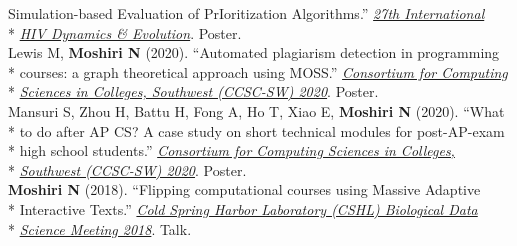 \documentclass[margin,line]{res}
\begin{document}
\begin{resume}
\hspace*{9mm} Simulation-based Evaluation of PrIoritization Algorithms.'' \href{https://cme.ucsd.edu/hivdynamics/}{\textit{27th International}}\\*\vspace{2mm}
\hspace*{8mm} \href{https://cme.ucsd.edu/hivdynamics/}{\textit{HIV Dynamics \& Evolution}}. Poster.\\
\hspace*{4mm} Lewis M, \textbf{Moshiri N} (2020). ``Automated plagiarism detection in programming\\*
\hspace*{9mm} courses: a graph theoretical approach using MOSS.'' \href{http://ccsc.org/southwestern/2020/index.php}{\textit{Consortium for Computing}}\\*\vspace{2mm}
\hspace*{8mm} \href{http://ccsc.org/southwestern/2020/index.php}{\textit{Sciences in Colleges, Southwest (CCSC-SW) 2020}}. Poster.\\
\hspace*{4mm} Mansuri S, Zhou H, Battu H, Fong A, Ho T, Xiao E, \textbf{Moshiri N} (2020). ``What\\*
\hspace*{9mm} to do after AP CS? A case study on short technical modules for post-AP-exam\\*
\hspace*{9mm} high school students.'' \href{http://ccsc.org/southwestern/2020/index.php}{\textit{Consortium for Computing Sciences in Colleges,}}\\*\vspace{2mm}
\hspace*{8mm} \href{http://ccsc.org/southwestern/2020/index.php}{\textit{Southwest (CCSC-SW) 2020}}. Poster.\\
\hspace*{4mm} \textbf{Moshiri N} (2018). ``Flipping computational courses using Massive Adaptive\\*
\hspace*{9mm} Interactive Texts.'' \href{http://meetings.cshl.edu/meetings.aspx?meet=DATA&year=18}{\textit{Cold Spring Harbor Laboratory (CSHL) Biological Data}}\\*\vspace{2mm}
\hspace*{8mm} \href{http://meetings.cshl.edu/meetings.aspx?meet=DATA&year=18}{\textit{Science Meeting 2018}}. Talk.\\

\end{resume}
\end{document}
